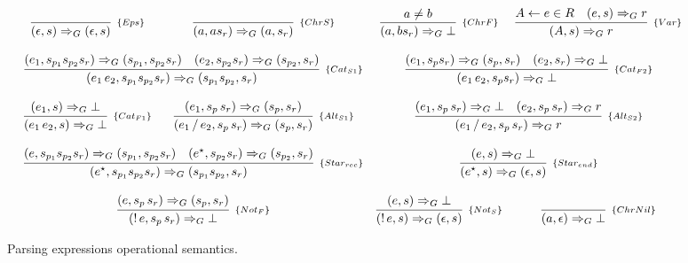 \documentclass[10pt,sigplan,screen,review,anonymous]{acmart}
\begin{document}
\begin{figure*}[h!]
   \[
      \begin{array}{cccc}
         \infer[_{\{Eps\}}]{(\epsilon,s)\Rightarrow_G (\epsilon,s)}{} &
         \infer[_{\{ChrS\}}]{(a,as_r) \Rightarrow_G (a,s_r)}{}  &
         \infer[_{\{ChrF\}}]{(a,bs_r) \Rightarrow_G \bot}{a \neq b} &
         \infer[_{\{Var\}}]{(A,s) \Rightarrow_G r}
                           {A \leftarrow e \in R & (e,s) \Rightarrow_G r} \\ \\
         \multicolumn{2}{c}{
            \infer[_{\{Cat_{S1}\}}]{(e_1\,e_2,s_{p_1}s_{p_2}s_r) \Rightarrow_G (s_{p_1}s_{p_2}, s_r)}
                                 {(e_1,s_{p_1}s_{p_2}s_r) \Rightarrow_G (s_{p_1},s_{p_2}s_r) &
                                 (e_2,s_{p_2}s_r)\Rightarrow_G (s_{p_2},s_r)}
         } &
         \multicolumn{2}{c}{
            \infer[_{\{Cat_{F2}\}}]{(e_1\,e_2,s_ps_r) \Rightarrow_G \bot}
                                 { (e_1,s_ps_r) \Rightarrow_G (s_p,s_r) &
                                    (e_2,s_r) \Rightarrow_G \bot}} \\ \\
         \infer[_{\{Cat_{F1}\}}]{(e_1\,e_2,s)\Rightarrow_G \bot}{(e_1,s) \Rightarrow_G \bot} &
         \infer[_{\{Alt_{S1}\}}]{(e_1\,/\,e_2,s_p\,s_r) \Rightarrow_G (s_p,s_r)}
                                {(e_1,s_p\,s_r)\Rightarrow_G (s_p,s_r)} &
         \multicolumn{2}{c}{
            \infer[_{\{Alt_{S2}\}}]{(e_1\,/\,e_2,s_p\,s_r) \Rightarrow_G r}
                                  {(e_1,s_p\,s_r)\Rightarrow_G \bot &
                                   (e_2,s_p\,s_r)\Rightarrow_G r}
         } \\ \\
         \multicolumn{2}{c}{
            \infer[_{\{Star_{rec}\}}]{(e^\star,s_{p_1}s_{p_2}s_r) \Rightarrow_G (s_{p_1}s_{p_2},s_r)}
                                 {(e,s_{p_1}s_{p_2}s_r) \Rightarrow_G (s_{p_1},s_{p_2}s_r) &
                                  (e^\star, s_{p_2}s_r) \Rightarrow_G (s_{p_2},s_r)}
         } &
         \multicolumn{2}{c}{
            \infer[_{\{Star_{end}\}}]{(e^\star,s) \Rightarrow_G (\epsilon,s)}
                                    {(e,s) \Rightarrow_G \bot}} \\ \\
         \multicolumn{2}{c}{
            \infer[_{\{Not_F\}}]{(!\,e,s_p\,s_r) \Rightarrow_G \bot}
                               {(e,s_p\,s_r) \Rightarrow_G (s_p,s_r)}
         } &
         \infer[_{\{Not_S\}}]{(!\,e,s) \Rightarrow_G (\epsilon,s)}
         {(e,s) \Rightarrow_G \bot}
           &
         \infer[_{\{ChrNil\}}]{(a,\epsilon) \Rightarrow_G \bot}{}
      \end{array}
   \]
   \centering
   \caption{Parsing expressions operational semantics.}
   \label{fig:pegsemantics}
\end{figure*}
\end{document}
